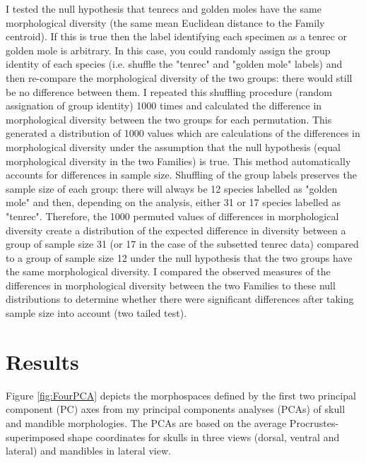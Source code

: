 	I tested the null hypothesis that tenrecs and golden moles have the same morphological diversity (the same mean Euclidean distance to the Family centroid). If this is true then the label identifying each specimen as a tenrec or golden mole is arbitrary. In this case, you could randomly assign the group identity of each species (i.e. shuffle the "tenrec" and "golden mole" labels) and then re-compare the morphological diversity of the two groups: there would still be no difference between them. I repeated this shuffling procedure (random assignation of group identity) 1000 times and calculated the difference in morphological diversity between the two groups for each permutation. This generated a distribution of 1000 values which are calculations of the differences in morphological diversity under the assumption that the null hypothesis (equal morphological diversity in the two Families) is true. This method automatically accounts for differences in sample size. Shuffling of the group labels preserves the sample size of each group: there will always be 12 species labelled as "golden mole" and then, depending on the analysis, either 31 or 17 species labelled as "tenrec". Therefore, the 1000 permuted values of differences in morphological diversity create a distribution of the expected difference in diversity between a group of sample size 31 (or 17 in the case of the subsetted tenrec data) compared to a group of sample size 12 under the null hypothesis that the two groups have the same morphological diversity. I compared the observed measures of the differences in morphological diversity between the two Families to these null distributions to determine whether there were significant differences after taking sample size into account (two tailed test).

	

\section{Results}
\label{sect:results}

	Figure \ref{fig:FourPCA} depicts the morphospaces defined by the first two principal component (PC) axes from my principal components analyses (PCAs) of skull and mandible morphologies. The PCAs are based on the average Procrustes-superimposed shape coordinates for skulls in three views (dorsal, ventral and lateral) and mandibles in lateral view.

